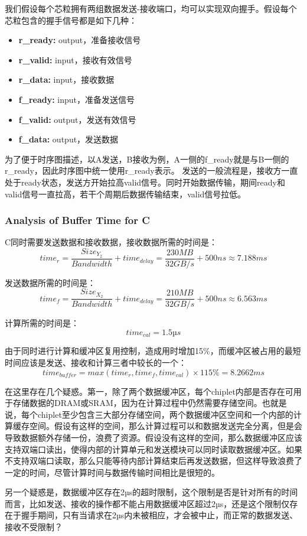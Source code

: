 \documentclass[11pt, a4 paper]{article}
\begin{document}
我们假设每个芯粒拥有两组数据发送-接收端口，均可以实现双向握手。假设每个芯粒包含的握手信号都是如下几种：
\begin{itemize}
    \item \textbf{r\_ready:} output，准备接收信号
    \item \textbf{r\_valid:} input，接收有效信号
    \item \textbf{r\_data:} input，接收数据
    \item \textbf{f\_ready:} input，准备发送信号
    \item \textbf{f\_valid:} output，发送有效信号
    \item \textbf{f\_data:} output，发送数据
\end{itemize}
为了便于时序图描述，以A发送，B接收为例，A一侧的f\_ready就是与B一侧的r\_ready，因此时序图中统一使用r\_ready表示。
发送的一般流程是，接收方一直处于ready状态，发送方开始拉高valid信号。同时开始数据传输，期间ready和valid信号一直拉高，若干个周期后数据传输结束，valid信号拉低。

\subsubsection{Analysis of Buffer Time for C}
C同时需要发送数据和接收数据，接收数据所需的时间是：
$$time_r = \frac{Size_{Y_2}}{Bandwidth} + time_{delay} = \frac{230MB}{32GB/s} + 500ns \approx 7.188ms$$

发送数据所需的时间是：
$$time_f = \frac{Size_{X_2}}{Bandwidth} + time_{delay} = \frac{210MB}{32GB/s} + 500ns \approx 6.563ms$$

计算所需的时间是：
$$time_{cal} = 1.5 µs$$

由于同时进行计算和缓冲区复用控制，造成用时增加15\%，而缓冲区被占用的最短时间应该是发送、接收和计算三者中较长的一个：
$$time_{buffer} = max(time_r, time_f, time_{cal}) \times 115\% = 8.2662ms $$

在这里存在几个疑惑。第一，除了两个数据缓冲区，每个chiplet内部是否存在可用于存储数据的DRAM或SRAM，因为在计算过程中仍然需要存储空间。也就是说，每个chiplet至少包含三大部分存储空间，两个数据缓冲区空间和一个内部的计算缓存空间。假设有这样的空间，那么计算过程可以和数据发送完全分离，但是会导致数据额外存储一份，浪费了资源。假设没有这样的空间，那么数据缓冲区应该支持双端口读出，使得内部的计算单元和发送模块可以同时读取数据缓冲区。如果不支持双端口读取，那么只能等待内部计算结束后再发送数据，但这样导致浪费了一定的时间，尽管计算时间与数据传输时间相比是很短的。

另一个疑惑是，数据缓冲区存在2µs的超时限制，这个限制是否是针对所有的时间而言，比如发送、接收的操作都不能占用数据缓冲区超过2µs，还是这个限制仅存在于握手期间，只有当请求在2µs内未被相应，才会被中止，而正常的数据发送、接收不受限制？
\end{document}
